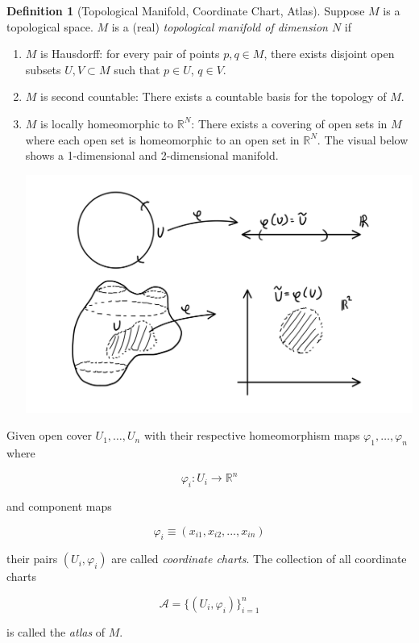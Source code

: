 \documentclass{article}
\theoremstyle{remark}
\theoremstyle{definition}
\newtheorem{definition}{Definition}[section]
\begin{document}
    \begin{definition}[Topological Manifold, Coordinate Chart, Atlas]
      Suppose $M$ is a topological space. $M$ is a (real) \textit{topological manifold of dimension $N$} if
      \begin{enumerate}
        \item $M$ is Hausdorff: for every pair of points $p, q \in M$, there exists disjoint open subsets $U, V \subset M$ such that $p \in U$, $q \in V$. 

        \item $M$ is second countable: There exists a countable basis for the topology of $M$. 

        \item $M$ is locally homeomorphic to $\mathbb{R}^N$: There exists a covering of open sets in $M$ where each open set is homeomorphic to an open set in $\mathbb{R}^N$. The visual below shows a 1-dimensional and 2-dimensional manifold. 

        \begin{center}
          \includegraphics[scale=0.20]{img/1_2_dim_Manifold_Coordinate_Chart.PNG}
        \end{center}
      \end{enumerate}

      Given open cover $U_1, \ldots, U_n$ with their respective homeomorphism maps $\varphi_1, \ldots, \varphi_n$ where

        \[\varphi_i : U_i \longrightarrow \mathbb{R}^n\]

      and component maps

        \[\varphi_i \equiv (x_{i1}, x_{i2}, ..., x_{in})\]

      their pairs $(U_i, \varphi_i)$ are called \textit{coordinate charts}. The collection of all coordinate charts 

        \[\mathcal{A} = \{(U_i, \varphi_i)\}_{i=1}^n\]

      is called the \textit{atlas} of $M$. 
    \end{definition}
\end{document}
